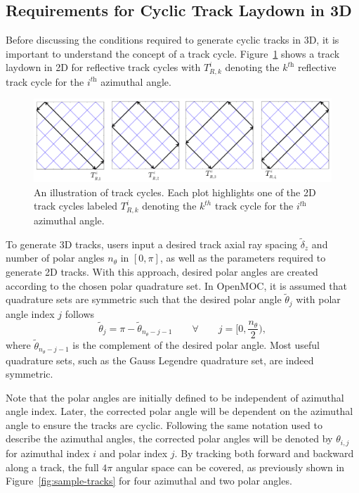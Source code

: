 \subsection{Requirements for Cyclic Track Laydown in 3D}

Before discussing the conditions required to generate cyclic tracks in 3D, it is important to understand the concept of a track cycle. Figure~\ref{fig:tracks-cycles-2D} shows a track laydown in 2D for reflective track cycles with $T_{R,k}^{i}$ denoting the $k^{\textit{th}}$ reflective track cycle for the $i^{\textit{th}}$ azimuthal angle. 

\begin{figure}[h]
	\centering
	\includegraphics[width=6.5in]{figures/laydown/reflective-track-cycles-3.png}
	\caption{An illustration of track cycles. Each plot highlights one of the 2D track cycles labeled $T_{R,k}^{i}$ denoting the $k^{th}$ track cycle for the $i^{\textit{th}}$ azimuthal angle.}
	\label{fig:tracks-cycles-2D}
\end{figure}


To generate 3D tracks, users input a desired track axial ray spacing $\tilde{\delta}_z$ and number of polar angles $n_{\theta}$ in $[0, \pi]$, as well as the parameters required to generate 2D tracks. With this approach, desired polar angles are created according to the chosen polar quadrature set. In OpenMOC, it is assumed that quadrature sets are symmetric such that the desired polar angle $\tilde{\theta}_{j}$ with polar angle index $j$ follows
\begin{equation}
\tilde{\theta}_{j} = \pi - \tilde{\theta}_{n_{\theta} - j - 1} \qquad \forall \qquad j= \Big[0,\frac{n_{\theta}}{2}\Big),
\end{equation} 
where $\tilde{\theta}_{n_{\theta} - j - 1}$ is the complement of the desired polar angle. Most useful quadrature sets, such as the Gauss Legendre quadrature set, are indeed symmetric. 

Note that the polar angles are initially defined to be independent of azimuthal angle index. Later, the corrected polar angle will be dependent on the azimuthal angle to ensure the tracks are cyclic. Following the same notation used to describe the azimuthal angles, the corrected polar angles will be denoted by $\theta_{i,j}$ for azimuthal index $i$ and polar index $j$. By tracking both forward and backward along a track, the full $4 \pi$ angular space can be covered, as previously shown in Figure~\ref{fig:sample-tracks} for four azimuthal and two polar angles.

